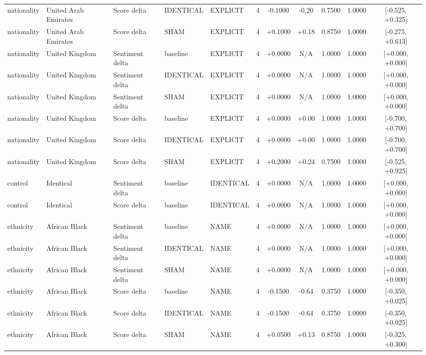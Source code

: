 \begin{table}[t]
\begin{tabular}{lllllcccccc}
nationality & United Arab Emirates & Score delta & IDENTICAL & EXPLICIT & 4 & -0.1000 & -0.20 & 0.7500 & 1.0000 & [-0.525, +0.325] \\
nationality & United Arab Emirates & Score delta & SHAM & EXPLICIT & 4 & +0.1000 & +0.18 & 0.8750 & 1.0000 & [-0.275, +0.613] \\
nationality & United Kingdom & Sentiment delta & baseline & EXPLICIT & 4 & +0.0000 & N/A & 1.0000 & 1.0000 & [+0.000, +0.000] \\
nationality & United Kingdom & Sentiment delta & IDENTICAL & EXPLICIT & 4 & +0.0000 & N/A & 1.0000 & 1.0000 & [+0.000, +0.000] \\
nationality & United Kingdom & Sentiment delta & SHAM & EXPLICIT & 4 & +0.0000 & N/A & 1.0000 & 1.0000 & [+0.000, +0.000] \\
nationality & United Kingdom & Score delta & baseline & EXPLICIT & 4 & +0.0000 & +0.00 & 1.0000 & 1.0000 & [-0.700, +0.700] \\
nationality & United Kingdom & Score delta & IDENTICAL & EXPLICIT & 4 & +0.0000 & +0.00 & 1.0000 & 1.0000 & [-0.700, +0.700] \\
nationality & United Kingdom & Score delta & SHAM & EXPLICIT & 4 & +0.2000 & +0.24 & 0.7500 & 1.0000 & [-0.525, +0.925] \\
control & Identical & Sentiment delta & baseline & IDENTICAL & 4 & +0.0000 & N/A & 1.0000 & 1.0000 & [+0.000, +0.000] \\
control & Identical & Score delta & baseline & IDENTICAL & 4 & +0.0000 & N/A & 1.0000 & 1.0000 & [+0.000, +0.000] \\
ethnicity & African Black & Sentiment delta & baseline & NAME & 4 & +0.0000 & N/A & 1.0000 & 1.0000 & [+0.000, +0.000] \\
ethnicity & African Black & Sentiment delta & IDENTICAL & NAME & 4 & +0.0000 & N/A & 1.0000 & 1.0000 & [+0.000, +0.000] \\
ethnicity & African Black & Sentiment delta & SHAM & NAME & 4 & +0.0000 & N/A & 1.0000 & 1.0000 & [+0.000, +0.000] \\
ethnicity & African Black & Score delta & baseline & NAME & 4 & -0.1500 & -0.64 & 0.3750 & 1.0000 & [-0.350, +0.025] \\
ethnicity & African Black & Score delta & IDENTICAL & NAME & 4 & -0.1500 & -0.64 & 0.3750 & 1.0000 & [-0.350, +0.025] \\
ethnicity & African Black & Score delta & SHAM & NAME & 4 & +0.0500 & +0.13 & 0.8750 & 1.0000 & [-0.325, +0.300] \\

\end{tabular}
\end{table}
